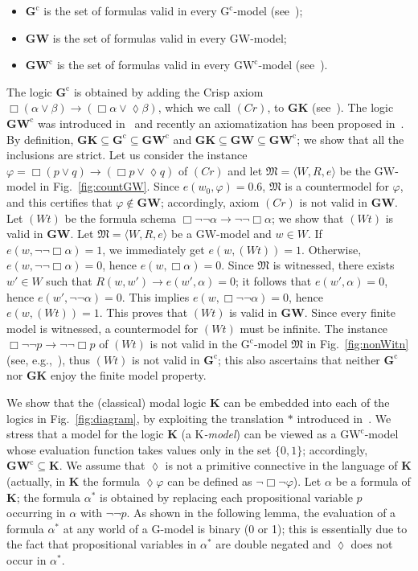 \documentclass[copyright,creativecommons]{eptcs}
\newcommand{\GKL}{\mathbf{GK}}
\newcommand{\GWCL}{\mathbf{GW}^\mathrm{c}}
\newcommand{\GWL}{\mathbf{GW}}
\newcommand{\GCL}{\mathbf{G}^\mathrm{c}}
\newcommand{\GWCM}{\mbox{$\mathrm{GW}^\mathrm{c}$}}
\newcommand{\GCM}{\mbox{$\mathrm{G}^\mathrm{c}$}}
\newcommand{\GM}{\mbox{$\mathrm{G}$}}
\newcommand{\GWM}{\mbox{$\mathrm{GW}$}}
\newcommand{\KM}{\mbox{$\mathrm{K}$}}
\newcommand{\KL}{\mathbf{K}}
\newcommand{\Diam}{\lozenge}
\newcommand{\stru}[1]{\langle #1 \rangle} %
\newcommand{\M}{\mathfrak{M}}
\renewcommand{\a}{\alpha}
\renewcommand{\b}{\beta}
\begin{document}
\begin{itemize}
\item $\GCL$ is the set of formulas valid in every  \GCM-model
  (see~\cite{RodriguezV:21});
\item $\GWL$ is the set of formulas valid in every \GWM-model;
\item $\GWCL$ is the set of formulas valid in every 
  \GWCM-model (see~\cite{FerFioRod:2025}).
\end{itemize}


\noindent
The logic $\GCL$ is obtained by adding the Crisp axiom
$\Box(\a\lor\b)\to (\Box \a \lor \Diam \b)$, which we call $(Cr)$, to
$\GKL$ (see~\cite{RodriguezV:21}).  The logic $\GWCL$ was introduced
in~\cite{FerFioRod:2025} and recently an axiomatization has been
proposed in~\cite{RV26}.  By definition,
$\GKL\subseteq\GCL\subseteq\GWCL$ and
$\GKL\subseteq\GWL\subseteq\GWCL$; we show that all the inclusions are
strict.  Let us consider the instance $\varphi =\Box (p\lor q)\to
(\Box p \lor \Diam q)$ of $(Cr)$ and let $\M=\stru{W,R,e}$ be the
$\GWM$-model in Fig.~\ref{fig:countGW}.  Since $e(w_0,\varphi) = 0.6$,
$\M$ is a countermodel for $\varphi$, and this certifies that
$\varphi\not\in\GWL$; accordingly, axiom $(Cr)$ is not valid in
$\GWL$.  Let $(Wt)$ be the formula schema $\Box \neg\neg \a\to
\neg\neg \Box \a$; we show that $(Wt)$ is valid in $\GWL$.  Let
$\M=\stru{W,R,e}$ be a $\GWM$-model and $w\in W$.  If $e(w, \neg\neg
\Box \a)=1$, we immediately get $e(w, (Wt))=1$. Otherwise, $e(w,
\neg\neg \Box \a)=0$, hence $e(w, \Box \a)=0$.  Since $\M$ is
witnessed, there exists $w'\in W$ such that $R(w,w') \to e(w',\a) =
0$; it follows that $e(w',\a)=0$, hence $e(w',\neg \neg \a)=0$.  This
implies $e(w, \Box\neg \neg \a)=0$, hence $e(w, (Wt)) = 1$. This
proves that $(Wt)$ is valid in $\GWL$.  Since every finite model is
witnessed, a countermodel for $(Wt)$ must be infinite.  The instance
$\Box \neg\neg p\to \neg\neg \Box p$ of $(Wt)$ is not valid in the
$\GCM$-model $\M$ in Fig.~\ref{fig:nonWitn} (see,
e.g.,~\cite{FerFioRod:2025}), thus $(Wt)$ is not valid in $\GCL$; this
also ascertains that neither $\GCL$ nor $\GKL$ enjoy the finite model
property.

We show that the (classical) modal logic $\KL$ can be embedded into
each of the logics in Fig.~\ref{fig:diagram}, by exploiting the
translation $*$ introduced in~\cite{MetOli1}.  We stress that a model
for the logic $\KL$ (a \emph{$\KM$-model}) can be viewed as a
$\GWCM$-model whose evaluation function takes values only in the set
$\{0,1\}$; accordingly, $\GWCL\subseteq\KL$.  We assume that $\Diam$
is not a primitive connective in the language of $\KL$ (actually, in
$\KL$ the formula $\Diam\varphi$ can be defined as
$\neg\Box\neg\varphi$).  Let $\a$ be a formula of $\KL$; the formula
$\a^*$ is obtained by replacing each propositional variable $p$
occurring in $\a$ with $\neg\neg p$.  As shown in the following lemma,
the evaluation of a formula $\a^*$ at any world of a $\GM$-model is
binary (0 or 1); this is essentially due to the fact that
propositional variables in $\a^*$ are double negated and $\Diam$ does
not occur in $\a^*$.
\end{document}
